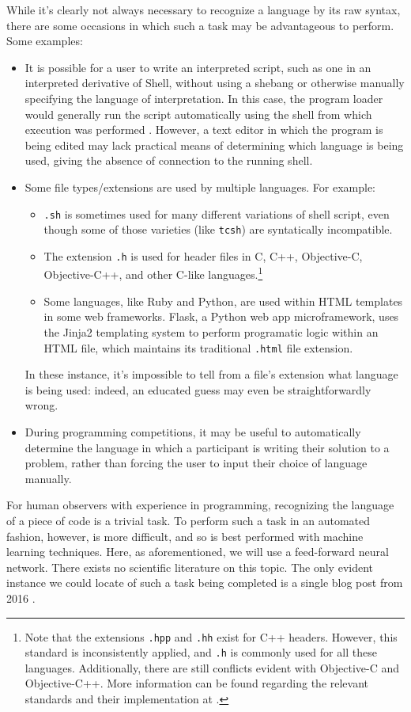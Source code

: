 \documentclass{article}
\begin{document}
While it's clearly not always necessary to recognize a language by its raw syntax, there are some occasions in which such a task may be advantageous to perform. Some examples:
\begin{itemize}
  \item{It is possible for a user to write an interpreted script, such as one in an interpreted derivative of Shell, without using a shebang or otherwise manually specifying the language of interpretation. In this case, the program loader would generally run the script automatically using the shell from which execution was performed \cite{shebang}. However, a text editor in which the program is being edited may lack practical means of determining which language is being used, giving the absence of connection to the running shell.}
  \item{Some file types/extensions are used by multiple languages. For example:
  \begin{itemize}
    \item{\texttt{.sh} is sometimes used for many different variations of shell script, even though some of those varieties (like \texttt{tcsh}) are syntatically incompatible.}
    \item{The extension \texttt{.h} is used for header files in C, C++, Objective-C, Objective-C++, and other C-like languages.\footnote{Note that the extensions \texttt{.hpp} and \texttt{.hh} exist for C++ headers. However, this standard is inconsistently applied, and \texttt{.h} is commonly used for all these languages. Additionally, there are still conflicts evident with Objective-C and Objective-C++. More information can be found regarding the relevant standards and their implementation at \cite{atomh}.}}
    \item{Some languages, like Ruby and Python, are used within HTML templates in some web frameworks. Flask, a Python web app microframework, uses the Jinja2 templating system to perform programatic logic within an HTML file, which maintains its traditional \texttt{.html} file extension.}
  \end{itemize}
  In these instance, it's impossible to tell from a file's extension what language is being used: indeed, an educated guess may even be straightforwardly wrong.}
  \item{During programming competitions, it may be useful to automatically determine the language in which a participant is writing their solution to a problem, rather than forcing the user to input their choice of language manually.}
\end{itemize}
For human observers with experience in programming, recognizing the language of a piece of code is a trivial task. To perform such a task in an automated fashion, however, is more difficult, and so is best performed with machine learning techniques. Here, as aforementioned, we will use a feed-forward neural network. There exists no scientific literature on this topic. The only evident instance we could locate of such a task being completed is a single blog post from 2016 \cite{proglangidmedium}.
\end{document}
